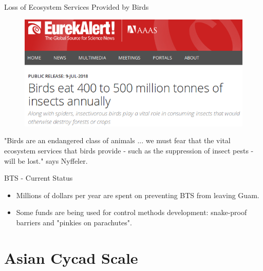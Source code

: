 \documentclass[]{beamer}
\begin{document}
\begin{frame}{Loss of Ecosystem Services Provided by Birds}
	\begin{figure}
		\includegraphics[height=0.5\textheight]{eureka-bird-loss.png}
	\end{figure}
"Birds are an endangered class of animals ... we must fear that the vital ecosystem services that birds provide - such as the suppression of insect pests - will be lost." says Nyffeler.
\end{frame}

\begin{frame}{BTS - Current Status}
	\begin{itemize}
		\item Millions of dollars per year are spent on preventing BTS from leaving Guam.
		\item Some funds are being used for control methods development: snake-proof barriers and "pinkies on parachutes".
	\end{itemize}
\end{frame}

\section*{Asian Cycad Scale}
\end{document}

